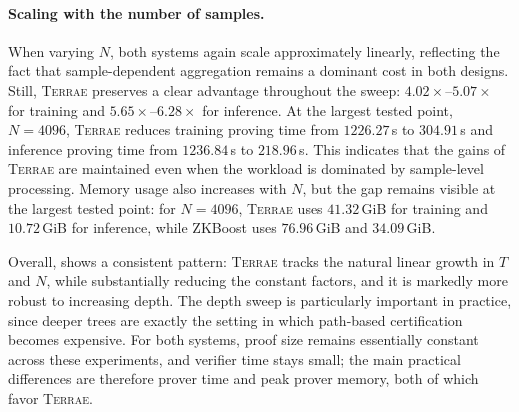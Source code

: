 \paragraph{Scaling with the number of samples.}
When varying $N$, both systems again scale approximately linearly, reflecting
the fact that sample-dependent aggregation remains a dominant cost in both
designs.  Still, \textsc{Terrae} preserves a clear advantage throughout the
sweep: $4.02\times$--$5.07\times$ for training and $5.65\times$--$6.28\times$
for inference.  At the largest tested point, $N=4096$, \textsc{Terrae} reduces
training proving time from $1226.27$\,s to $304.91$\,s and inference proving
time from $1236.84$\,s to $218.96$\,s.  This indicates that the gains of
\textsc{Terrae} are maintained even when the workload is dominated by
sample-level processing.  Memory usage also increases with $N$, but the gap
remains visible at the largest tested point: for $N=4096$, \textsc{Terrae} uses
$41.32$\,GiB for training and $10.72$\,GiB for inference, while ZKBoost uses
$76.96$\,GiB and $34.09$\,GiB.

Overall,  shows a consistent pattern: \textsc{Terrae}
tracks the natural linear growth in $T$ and $N$, while substantially reducing
the constant factors, and it is markedly more robust to increasing depth.  The
depth sweep is particularly important in practice, since deeper trees are
exactly the setting in which path-based certification becomes expensive.  For
both systems, proof size remains essentially constant across these experiments,
and verifier time stays small; the main practical differences are therefore
prover time and peak prover memory, both of which favor \textsc{Terrae}.
